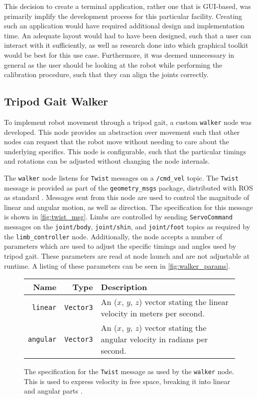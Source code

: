 This decision to create a terminal application, rather one that is GUI-based, was primarily  implify the development process for this particular facility. Creating such an application would have required additional design and implementation time. An adequate layout would had to have been designed, such that a user can interact with it sufficiently, as well as research done into which graphical toolkit would be best for this use case. Furthermore, it was deemed unnecessary in general as the user should be looking at the robot while performing the calibration procedure, such that they can align the joints correctly.

\subsection{Tripod Gait Walker}

To implement robot movement through a tripod gait, a custom \texttt{walker} node was developed. This node provides an abstraction over movement such that other nodes can request that the robot move without needing to care about the underlying specifics. This node is configurable, such that the particular timings and rotations can be adjusted without changing the node internals.

The \texttt{walker} node listens for \texttt{Twist} messages on a \texttt{/cmd\_vel} topic. The \texttt{Twist} message is provided as part of the \texttt{geometry\_msgs} package, distributed with ROS as standard \cite{ros_api_twist_msg}. Messages sent from this node are used to control the magnitude of linear and angular motion, as well as direction. The specification for this message is shown in \autoref{fig:twist_msg}. Limbs are controlled by sending \texttt{ServoCommand} messages on the \texttt{joint/body}, \texttt{joint/shin}, and \texttt{joint/foot} topics as required by the \texttt{limb\_controller} node. Additionally, the node accepts a number of parameters which are used to adjust the specific timings and angles used by tripod gait. These parameters are read at node launch and are not adjustable at runtime. A listing of these parameters can be seen in \autoref{fig:walker_params}.

\begin{figure}[h!]
	\centering
	\begin{tabular}{ r r p{10cm} }
		\toprule
		\textbf{Name} & 
		\textbf{Type} & 
		\textbf{Description} \\
		\midrule

		\texttt{linear} & 
		\texttt{Vector3} &
		An ($x$, $y$, $z$) vector stating the linear velocity in meters per second. \\
		
		\hline

		\texttt{angular} & 
		\texttt{Vector3} & 
		An ($x$, $y$, $z$) vector stating the angular velocity in radians per second. \\
		\bottomrule
	\end{tabular}
	\caption{The specification for the \texttt{Twist} message as used by the \texttt{walker} node. This is used to express velocity in free space, breaking it into linear and angular parts \cite{ros_api_twist_msg}.}
	\label{fig:twist_msg}
\end{figure}

